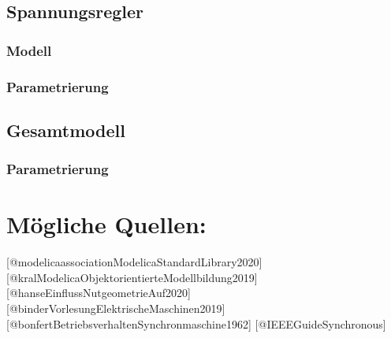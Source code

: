 \hypertarget{spannungsregler}{%
\subsection{Spannungsregler}\label{spannungsregler}}

\hypertarget{modell-3}{%
\subsubsection{Modell}\label{modell-3}}

\hypertarget{parametrierung-3}{%
\subsubsection{Parametrierung}\label{parametrierung-3}}

\hypertarget{gesamtmodell}{%
\subsection{Gesamtmodell}\label{gesamtmodell}}

\hypertarget{parametrierung-4}{%
\subsubsection{Parametrierung}\label{parametrierung-4}}

\hypertarget{muxf6gliche-quellen}{%
\section{Mögliche Quellen:}\label{muxf6gliche-quellen}}

{[}@modelicaassociationModelicaStandardLibrary2020{]}
{[}@kralModelicaObjektorientierteModellbildung2019{]}
{[}@hanseEinflussNutgeometrieAuf2020{]}
{[}@binderVorlesungElektrischeMaschinen2019{]}
{[}@bonfertBetriebsverhaltenSynchronmaschine1962{]}
{[}@IEEEGuideSynchronous{]}
